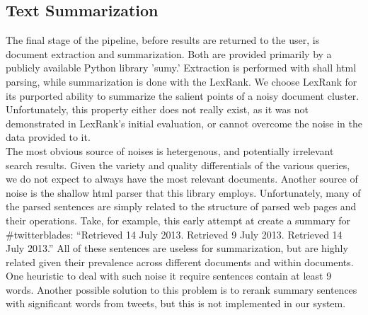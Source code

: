 \documentclass{sig-alternate}
\begin{document}
\subsection{Text Summarization}
The final stage of the pipeline, before results are returned to the user, is document extraction and summarization.  Both are provided primarily by a publicly available Python library 'sumy.'  Extraction is performed with shall html parsing, while summarization is done with the LexRank.\cite{lexrank}  We choose LexRank for its purported ability to summarize the salient points of a noisy document cluster.  Unfortunately, this property either does not really exist, as it was not demonstrated in LexRank's initial evaluation, or cannot overcome the noise in the data provided to it.\\
The most obvious source of noises is hetergenous, and potentially irrelevant search results.  Given the variety and quality differentials of the various queries, we do not expect to always have the most relevant documents. Another source of noise is the shallow html parser that this library employs.  Unfortunately, many of the parsed sentences are simply related to the structure of parsed web pages and their operations.  Take, for example, this early attempt at create a summary for \#twitterblades: ``Retrieved 14 July 2013. Retrieved 9 July 2013. Retrieved 14 July 2013.''  All of these sentences are useless for summarization, but are highly related given their prevalence across different documents and within documents.  One heuristic to deal with such noise it require sentences contain at least 9 words.  Another possible solution to this problem is to rerank summary sentences with significant words from tweets, but this is not implemented in our system.


\label{sec:evaluation}
\end{document}
